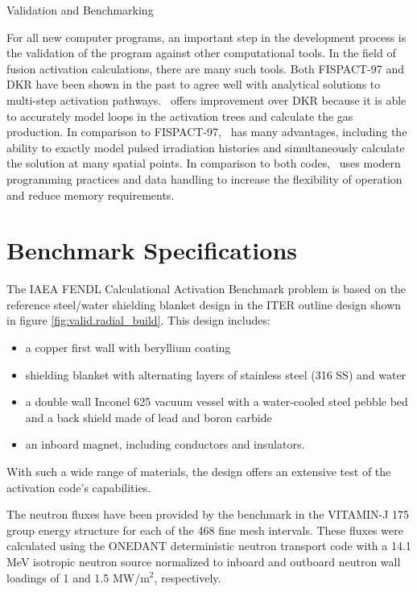 \begin{chapter}{Validation and Benchmarking}

For all new computer programs, an important step in the development
process is the validation of the program against other computational
tools.  In the field of fusion activation calculations, there are many
such tools.  Both FISPACT-97 and DKR have been shown in the past to
agree well with analytical solutions to multi-step activation
pathways\cite{bib:IAEA.bench2.rep}.  \ALARA\ offers improvement over
DKR because it is able to accurately model loops in the activation
trees and calculate the gas production.  In comparison to FISPACT-97,
\ALARA\ has many advantages, including the ability to exactly model
pulsed irradiation histories and simultaneously calculate the solution
at many spatial points.  In comparison to both codes, \ALARA\ uses
modern programming practices and data handling to increase the
flexibility of operation and reduce memory requirements.

\section{Benchmark Specifications}

The IAEA FENDL Calculational Activation
Benchmark\cite{bib:IAEA.bench1.spec} problem is based on the reference
steel/water shielding blanket design in the ITER outline design shown
in figure \ref{fig:valid.radial_build}.  This design includes:
\begin{itemize}
\item a copper first wall with beryllium coating
\item shielding blanket with alternating layers of stainless steel
  (316 SS) and water
\item a double wall Inconel 625 vacuum vessel with a water-cooled
  steel pebble bed and a back shield made of lead and boron carbide
\item an inboard magnet, including conductors and insulators.
\end{itemize}
With such a wide range of materials, the design offers an extensive
test of the activation code's capabilities.

The neutron fluxes have been provided by the benchmark in the
VITAMIN-J 175 group energy structure for each of the 468 fine mesh
intervals.  These fluxes were calculated using the
ONEDANT\cite{bib:ONEDANT} deterministic neutron transport code with a
14.1 MeV isotropic neutron source normalized to inboard and outboard
neutron wall loadings of 1 and 1.5 MW/m$^2$, respectively.


\end{chapter}
